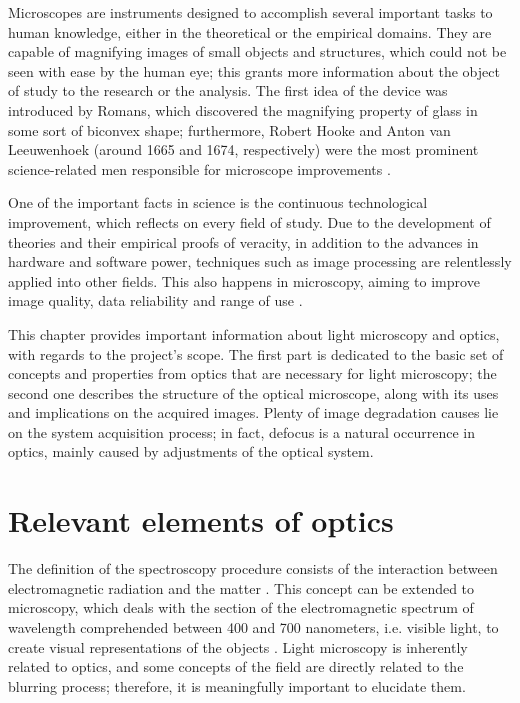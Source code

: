 Microscopes are instruments designed to accomplish several important tasks to human knowledge, either in the theoretical or the empirical domains. They are capable of magnifying images of small objects and structures, which could not be seen with ease by the human eye; this grants more information about the object of study to the research or the analysis. The first idea of the device was introduced by Romans, which discovered the magnifying property of glass in some sort of biconvex shape; furthermore, Robert Hooke and Anton van Leeuwenhoek (around 1665 and 1674, respectively) were the most prominent science-related men responsible for microscope improvements \cite{wu2008microscope}.

One of the important facts in science is the continuous technological improvement, which reflects on every field of study. Due to the development of theories and their empirical proofs of veracity, in addition to the advances in hardware and software power, techniques such as image processing are relentlessly applied into other fields. This also happens in microscopy, aiming to improve image quality, data reliability and range of use \cite{boyde1990modern}.

This chapter provides important information about light microscopy and optics, with regards to the project's scope. The first part is dedicated to the basic set of concepts and properties from optics that are necessary for light microscopy; the second one describes the structure of the optical microscope, along with its uses and implications on the acquired images. Plenty of image degradation causes lie on the system acquisition process; in fact, defocus is a natural occurrence in optics, mainly caused by adjustments of the optical system.

\section{Relevant elements of optics}

The definition of the spectroscopy procedure consists of the interaction between electromagnetic radiation and the matter \cite{gauglitz2006handbook}. This concept can be extended to microscopy, which deals with the section of the electromagnetic spectrum of wavelength comprehended between 400 and 700 nanometers, i.e. visible light,  to create visual representations of the objects
\cite{bell2009introduction}. Light microscopy is inherently related to optics, and some concepts of the field are directly related to the blurring process; therefore, it is meaningfully important to elucidate them.

